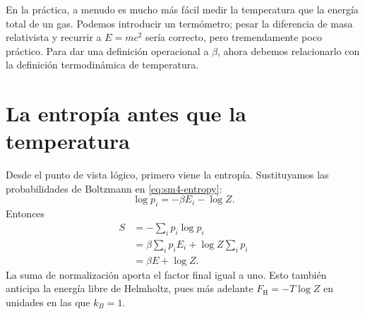 \begin{classroomqa}\end{classroomqa}

En la práctica, a menudo es mucho más fácil medir la temperatura que la energía total de un gas. Podemos introducir un termómetro; pesar la diferencia de masa relativista y recurrir a \(E=mc^2\) sería correcto, pero tremendamente poco práctico. Para dar una definición operacional a \(\beta\), ahora debemos relacionarlo con la definición termodinámica de temperatura.

\section{La entropía antes que la temperatura}

Desde el punto de vista lógico, primero viene la entropía. Sustituyamos las probabilidades de Boltzmann en \eqref{eq:sm4-entropy}:
\begin{equation}
 \log p_i=-\beta E_i-\log Z.
\end{equation}
Entonces
\begin{align}
 S
 &=-\sum_i p_i\log p_i\\
 &=\beta\sum_i p_iE_i+\log Z\sum_i p_i\\
 &=\beta E+\log Z.
 \label{eq:sm4-entropy-logz}
\end{align}
La suma de normalización aporta el factor final igual a uno. Esto también anticipa la energía libre de Helmholtz, pues más adelante \(F_{\mathrm H}=-T\log Z\) en unidades en las que \(k_B=1\).

\begin{classroomqa}\end{classroomqa}

\begin{classroomqa}\end{classroomqa}

